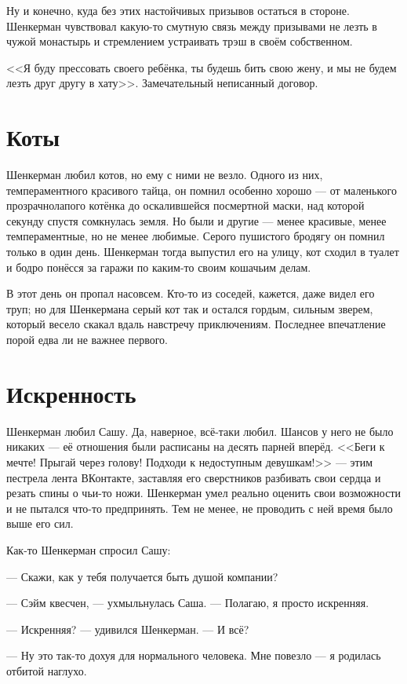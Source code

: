 \documentclass[a4paper,10pt,fleqn]{book}\usepackage{polyglossia}\setdefaultlanguage{english}\setotherlanguage{russian}\defaultfontfeatures{Ligatures=TeX,Mapping=tex-text} \usepackage{xcolor}\definecolor{lightgray}{HTML}{bbbbbb}\color{lightgray}\newcommand{\ml}[3]{\textcolor{black}{#3}}
\begin{document}
Ну и конечно, куда без этих настойчивых призывов остаться в стороне.
Шенкерман чувствовал какую-то смутную связь между призывами не лезть в чужой монастырь и стремлением устраивать трэш в своём собственном.

<<Я буду прессовать своего ребёнка, ты будешь бить свою жену, и мы не будем лезть друг другу в хату>>.
Замечательный неписанный договор.

\section{Коты}

Шенкерман любил котов, но ему с ними не везло.
Одного из них, темпераментного красивого тайца, он помнил особенно хорошо --- от маленького прозрачнолапого котёнка до оскалившейся посмертной маски, над которой секунду спустя сомкнулась земля.
Но были и другие --- менее красивые, менее темпераментные, но не менее любимые.
Серого пушистого бродягу он помнил только в один день.
Шенкерман тогда выпустил его на улицу, кот сходил в туалет и бодро понёсся за гаражи по каким-то своим кошачьим делам.

В этот день он пропал насовсем.
Кто-то из соседей, кажется, даже видел его труп;
но для Шенкермана серый кот так и остался гордым, сильным зверем, который весело скакал вдаль навстречу приключениям.
Последнее впечатление порой едва ли не важнее первого.

\section{Искренность}

Шенкерман любил Сашу.
Да, наверное, всё-таки любил.
Шансов у него не было никаких --- её отношения были расписаны на десять парней вперёд.
<<Беги к мечте!
Прыгай через голову!
Подходи к недоступным девушкам!>> --- этим пестрела лента ВКонтакте, заставляя его сверстников разбивать свои сердца и резать спины о чьи-то ножи.
Шенкерман умел реально оценить свои возможности и не пытался что-то предпринять.
Тем не менее, не проводить с ней время было выше его сил.

Как-то Шенкерман спросил Сашу:

--- Скажи, как у тебя получается быть душой компании?

--- Сэйм квесчен, --- ухмыльнулась Саша.
--- Полагаю, я просто искренняя.

--- Искренняя? --- удивился Шенкерман.
--- И всё?

--- Ну это так-то дохуя для нормального человека.
Мне повезло --- я родилась отбитой наглухо.
\end{document}
